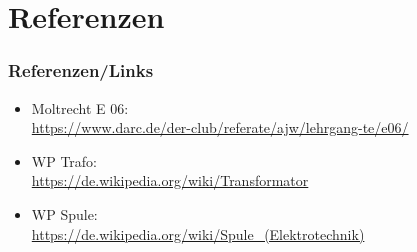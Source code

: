 %


\section*{Referenzen}

\begin{frame}
  \frametitle{Referenzen/Links}

  \footnotesize
  \begin{itemize}
    \item Moltrecht E 06: \\
      \url{https://www.darc.de/der-club/referate/ajw/lehrgang-te/e06/}
    \item WP Trafo: \\
      \url{https://de.wikipedia.org/wiki/Transformator}
    \item WP Spule: \\
      \url{https://de.wikipedia.org/wiki/Spule_(Elektrotechnik)}
  \end{itemize}

\end{frame}


